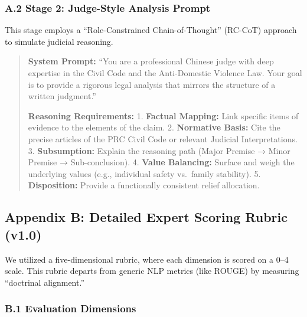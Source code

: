 \hypertarget{a.2-stage-2-judge-style-analysis-prompt}{%
\subsubsection{A.2 Stage 2: Judge-Style Analysis Prompt}\label{a.2-stage-2-judge-style-analysis-prompt}}

This stage employs a ``Role-Constrained Chain-of-Thought'' (RC-CoT) approach to simulate judicial reasoning.

\begin{quote}
\textbf{System Prompt:} ``You are a professional Chinese judge with deep expertise in the Civil Code and the Anti-Domestic Violence Law. Your goal is to provide a rigorous legal analysis that mirrors the structure of a written judgment.''

\textbf{Reasoning Requirements:} 1. \textbf{Factual Mapping:} Link specific items of evidence to the elements of the claim. 2. \textbf{Normative Basis:} Cite the precise articles of the PRC Civil Code or relevant Judicial Interpretations. 3. \textbf{Subsumption:} Explain the reasoning path (Major Premise → Minor Premise → Sub-conclusion). 4. \textbf{Value Balancing:} Surface and weigh the underlying values (e.g., individual safety vs.~family stability). 5. \textbf{Disposition:} Provide a functionally consistent relief allocation.
\end{quote}

\hypertarget{appendix-b-detailed-expert-scoring-rubric-v1.0}{%
\subsection{Appendix B: Detailed Expert Scoring Rubric (v1.0)}\label{appendix-b-detailed-expert-scoring-rubric-v1.0}}

We utilized a five-dimensional rubric, where each dimension is scored on a 0--4 scale. This rubric departs from generic NLP metrics (like ROUGE) by measuring ``doctrinal alignment.''

\hypertarget{b.1-evaluation-dimensions}{%
\subsubsection{B.1 Evaluation Dimensions}\label{b.1-evaluation-dimensions}}

